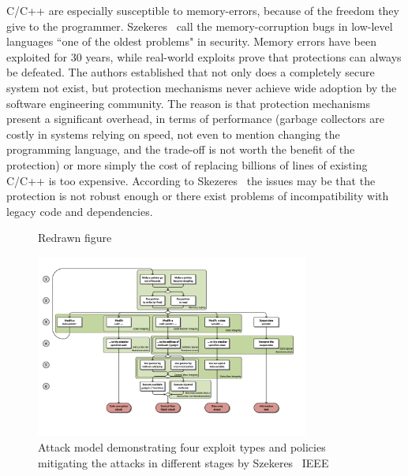 \documentclass[nomenclature, english, bibtex]{kththesis}
\begin{document}
C/C++ are especially susceptible to \gls{memory-error}s, because of the freedom they give to the programmer. Szekeres \etal\,\cite{szekeres_sok_2013} call the \gls{memory-corruption} bugs in low-level languages ``one of the oldest problems" in security. Memory errors have been exploited for 30 years, while real-world exploits prove that protections can always be defeated. The authors established that not only does a completely secure system not exist, but protection mechanisms never achieve wide adoption by the software engineering community. The reason is that protection mechanisms present a significant overhead, in terms of performance (\eg garbage collectors are costly in systems relying on speed, not even to mention changing the programming language, and the trade-off is not worth the benefit of the protection) or more simply the cost of replacing billions of lines of existing C/C++ is too expensive. According to Skezeres \etal\,\cite{szekeres_sok_2013} the issues may be that the protection is not robust enough or there exist problems of incompatibility with legacy code and dependencies.


  \begin{figure}[!ht]  \centering 

\caption{Redrawn figure}
\end{figure}
\FloatBarrier  




\begin{figure}
  \begin{center}
    \includegraphics[width=0.8\textwidth]{figures/sok.png}
  \end{center}
  \caption[Attack model demonstrating four exploit types and policies mitigating the attacks in different stages by Szekeres \etal\,]{Attack model demonstrating four exploit types and policies mitigating the attacks in different stages by Szekeres \etal\,\cite{szekeres_sok_2013}   IEEE}
  \label{fig:sok}
\end{figure}
\end{document}
